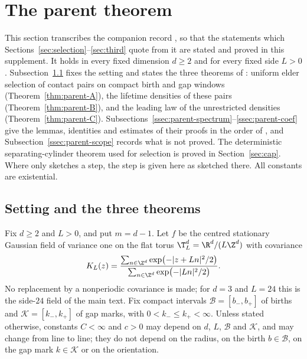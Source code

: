 \section{The parent theorem}\label{sec:parent}

This section transcribes the companion record \cite{parentP}, so that the statements which Sections~\ref{sec:selection}--\ref{sec:third} quote from it are stated and proved in this supplement. It holds in every fixed dimension $d\ge2$ and for every fixed side $L>0$. Subsection~\ref{ssec:parent-setting} fixes the setting and states the three theorems of \cite{parentP}: uniform elder selection of contact pairs on compact birth and gap windows (Theorem~\ref{thm:parent-A}), the lifetime densities of these pairs (Theorem~\ref{thm:parent-B}), and the leading law of the unrestricted densities (Theorem~\ref{thm:parent-C}). Subsections~\ref{ssec:parent-spectrum}--\ref{ssec:parent-coef} give the lemmas, identities and estimates of their proofs in the order of \cite{parentP}, and Subsection~\ref{ssec:parent-scope} records what is not proved. The deterministic separating-cylinder theorem used for selection is proved in Section~\ref{sec:cap}. Where \cite{parentP} only sketches a step, the step is given here as sketched there. All constants are existential.

\subsection{Setting and the three theorems}\label{ssec:parent-setting}

\begin{definition}\label{def:parent-model}
Fix $d\ge2$ and $L>0$, and put $m=d-1$. Let $f$ be the centred stationary Gaussian field of variance one on the flat torus $\T^d_L=\R^d/(L\Z^d)$ with covariance
\begin{equation}\label{eq:parent-KL}
K_L(z)=\frac{\sum_{n\in\Z^d}\exp\bigl(-|z+Ln|^2/2\bigr)}{\sum_{n\in\Z^d}\exp\bigl(-|Ln|^2/2\bigr)} .
\end{equation}
No replacement by a nonperiodic covariance is made; for $d=3$ and $L=24$ this is the side-$24$ field of the main text. Fix compact intervals $\mathcal B=[b_-,b_+]$ of births and $\mathcal K=[k_-,k_+]$ of gap marks, with $0<k_-\le k_+<\infty$. Unless stated otherwise, constants $C<\infty$ and $c>0$ may depend on $d$, $L$, $\mathcal B$ and $\mathcal K$, and may change from line to line; they do not depend on the radius, on the birth $b\in\mathcal B$, on the gap mark $k\in\mathcal K$ or on the orientation.
\end{definition}

